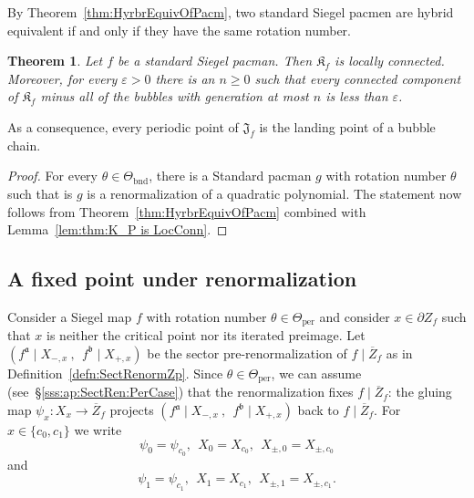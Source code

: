 \documentclass[]{amsart}
\renewcommand{\sp}{{\ \ }}
\newcommand\Jul{{\mathfrak J}}
\newcommand\Kfilled{{\mathfrak K}}
\renewcommand{\aa}{{\mathfrak{a}}}
\newcommand{\bb}{{\mathfrak{b}}}
\newtheorem{thm}{Theorem}[section]
\theoremstyle{remark}
\numberwithin{equation}{section}
\theoremstyle{definition}
\newcommand{\per}{{\mathrm{per}}}
\newcommand{\bnd}{{\mathrm{bnd}}}
\begin{document}
By Theorem~\ref{thm:HyrbrEquivOfPacm}, two standard Siegel pacmen are hybrid equivalent if and only if they have the same rotation number. 

\begin{thm}
\label{thm:LocConnOfJul for StandPacm}
Let $f$ be a standard Siegel pacman. Then $\Kfilled_f$ is locally connected. Moreover, for every $\varepsilon>0$ there is an $n\ge 0$ such that every connected component of $\Kfilled_f$ minus all of the bubbles with generation at most $n$ is less than $\varepsilon$.
\end{thm}

\noindent As a consequence, every periodic point of $\Jul_f$ is the landing point of a bubble chain.


\begin{proof}
For every $\theta\in \Theta_\bnd$, there is a Standard pacman $g$ with rotation number $\theta$ such that is $g$ is a renormalization of a quadratic polynomial.  The statement now follows from Theorem~\ref{thm:HyrbrEquivOfPacm} combined with Lemma~\ref{lem:thm:K_P is LocConn}.
\end{proof}



\subsection{A fixed point under renormalization}
\label{ss:FixedREnormPts}
Consider a Siegel map $f$ with rotation number $\theta\in \Theta_\per$ and consider $x\in \partial Z_f$ such that $x$ is neither the critical point nor its iterated preimage. Let ${(f^\aa\mid X_{-,x}~,\sp  f^\bb \mid X_{+,x})}$ be the sector pre-renormalization of $f\mid \overline Z_f$ as in Definition~\ref{defn:SectRenormZp}. Since $\theta\in \Theta_\per$, we can assume (see~\S\ref{sss:ap:SectRen:PerCase}) that the renormalization fixes $f\mid \overline Z_f$: the gluing map $\psi_x:X_x\to \overline Z_f$ projects ${(f^\aa\mid X_{-,x}~,\sp  f^\bb \mid X_{+,x})}$ back to $f\mid \overline Z_f.$ For $x\in\{c_0,c_1\}$ we write \[\psi_0=\psi_{c_0}, \sp X_0=X_{c_0}, \sp X_{\pm,0}=X_{\pm,c_0}\] and \[\psi_1=\psi_{c_1}, \sp X_1=X_{c_1}, \sp X_{\pm,1}=X_{\pm,c_1}.\]
\end{document}
